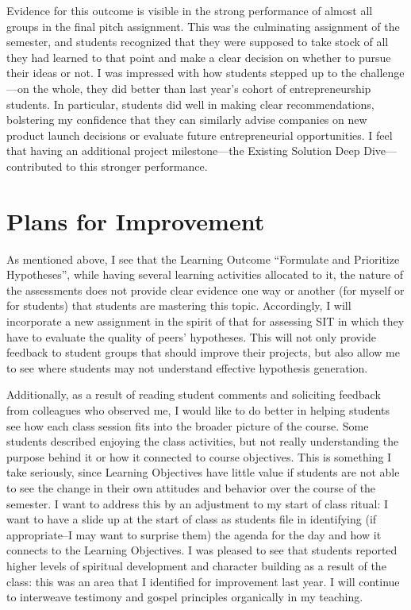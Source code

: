 \documentclass[11pt,article,oneside]{memoir}
\begin{document}
Evidence for this outcome is visible in the strong performance of almost
all groups in the final pitch assignment. This was the culminating
assignment of the semester, and students recognized that they were
supposed to take stock of all they had learned to that point and make a
clear decision on whether to pursue their ideas or not. I was impressed
with how students stepped up to the challenge---on the whole, they did
better than last year's cohort of entrepreneurship students. In
particular, students did well in making clear recommendations,
bolstering my confidence that they can similarly advise companies on new
product launch decisions or evaluate future entrepreneurial
opportunities. I feel that having an additional project milestone---the
Existing Solution Deep Dive---contributed to this stronger performance.

\section{Plans for Improvement}\label{plans-for-improvement}

As mentioned above, I see that the Learning Outcome \enquote{Formulate
and Prioritize Hypotheses}, while having several learning activities
allocated to it, the nature of the assessments does not provide clear
evidence one way or another (for myself or for students) that students
are mastering this topic. Accordingly, I will incorporate a new
assignment in the spirit of that for assessing SIT in which they have to
evaluate the quality of peers' hypotheses. This will not only provide
feedback to student groups that should improve their projects, but also
allow me to see where students may not understand effective hypothesis
generation.

Additionally, as a result of reading student comments and soliciting
feedback from colleagues who observed me, I would like to do better in
helping students see how each class session fits into the broader
picture of the course. Some students described enjoying the class
activities, but not really understanding the purpose behind it or how it
connected to course objectives. This is something I take seriously,
since Learning Objectives have little value if students are not able to
see the change in their own attitudes and behavior over the course of
the semester. I want to address this by an adjustment to my start of
class ritual: I want to have a slide up at the start of class as
students file in identifying (if appropriate--I may want to surprise
them) the agenda for the day and how it connects to the Learning
Objectives. I was pleased to see that students reported higher levels of
spiritual development and character building as a result of the class:
this was an area that I identified for improvement last year. I will
continue to interweave testimony and gospel principles organically in my
teaching.
\end{document}
